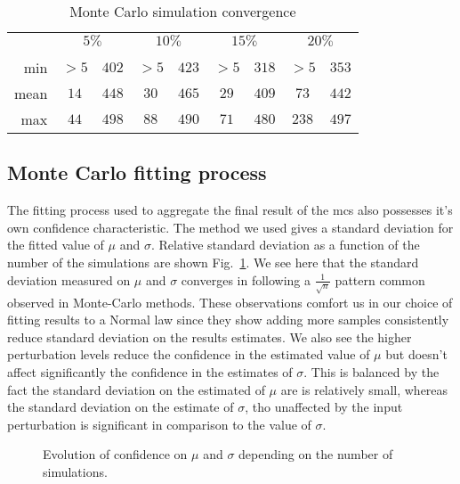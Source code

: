 \documentclass[10pt,conference,compsocconf]{IEEEtran}
\newcommand*\rot{\rotatebox{90}}
\begin{document}
\begin{table}
	\centering
	\begin{tabular}{rcc|cc|cc|cc}
		\cline{2-9}
		& \multicolumn{2}{c|}{$5\%$}& \multicolumn{2}{c|}{$10\%$}&
		\multicolumn{2}{c|}{$15\%$}& \multicolumn{2}{c}{$20\%$}\\
		&\rot{$\mu.ae<.5\%$}&\rot{$\sigma.ae<1\%$}&\rot{$\mu.ae<.5\%$}&\rot{$\sigma.ae<1\%$}&\rot{$\mu.ae<.5\%$}&\rot{$\sigma.ae<1\%$}&\rot{$\mu.ae<.5\%$}&\rot{$\sigma.ae<1\%$}\\
		\hline
		min&$>5$&$402$&$>5$&$423$&$>5$&$318$&$>5$&$353$\\
		mean&$14$&$448$&$30$&$465$&$29$&$409$&$73$&$442$\\
		max&$44$&$498$&$88$&$490$&$71$&$480$&$238$&$497$\\
		\hline
	\end{tabular}
	\caption{Monte Carlo simulation convergence}
	\label{tab:mcs-convergence}
\end{table}

\subsection{Monte Carlo fitting process}

The fitting process used to aggregate the final result of the \ac{mcs} also 
possesses it's own confidence characteristic. The method we used
gives a standard deviation for the fitted value of $\mu$ and $\sigma$. Relative
standard deviation as a function of the number of the simulations are shown
Fig.~\ref{fig:confidence}. We see here that the standard deviation measured on
$\mu$ and $\sigma$ converges in following a $\frac{1}{\sqrt{n}}$ pattern
common observed in Monte-Carlo methods. These observations comfort us in our
choice of fitting results to a Normal law since they show adding more samples
consistently reduce standard deviation on the results estimates. We also see the
higher perturbation levels reduce the confidence in the estimated value of $\mu$
but doesn't affect significantly the confidence in the estimates of $\sigma$.
This is balanced by the fact the standard deviation on the estimated of $\mu$
are is relatively small, whereas the standard deviation on the estimate of
$\sigma$, tho unaffected by the input perturbation is significant in comparison
to the value of $\sigma$.

\begin{figure}
	\centering
	\resizebox{0.5\textwidth}{!}{%
		
	}
	\resizebox{0.5\textwidth}{!}{%
		
	}
	\caption{Evolution of confidence on $\mu$ and $\sigma$ depending on the
	number of simulations.}
	\label{fig:confidence}
\end{figure}
\end{document}

